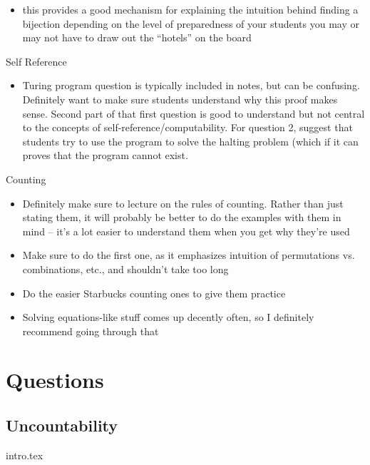 \documentclass{exam}
\begin{document}
\begin{questions}
\begin{itemize}
\begin{itemize}
\item this provides a good mechanism for explaining the intuition behind finding a bijection
depending on the level of preparedness of your students you may or may not have to draw out the “hotels” on the board
\end{itemize}
\end{itemize}
\item Self Reference
\begin{itemize}
\item Turing program question is typically included in notes, but can be confusing. Definitely want to make sure students understand why this proof makes sense. Second part of that first question is good to understand but not central to the concepts of self-reference/computability. For question 2, suggest that students try to use the program to solve the halting problem (which if it can proves that the program cannot exist.
\end{itemize}
\item Counting
\begin{itemize}
\item Definitely make sure to lecture on the rules of counting. Rather than just stating them, it will probably be better to do the examples with them in mind – it’s a lot easier to understand them when you get why they’re used
\item Make sure to do the first one, as it emphasizes intuition of permutations vs. combinations, etc., and shouldn’t take too long
\item Do the easier Starbucks counting ones to give them practice
\item Solving equations-like stuff comes up decently often, so I definitely recommend going through that
\end{itemize}
\end{questions}

\section{Questions}
\subsection{Uncountability}
\begin{enumerate}
{intro.tex}
\end{enumerate}
\end{document}
